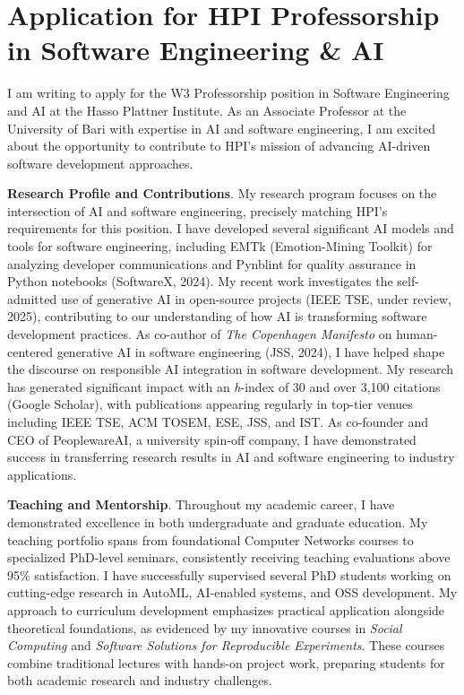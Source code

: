 \section{Application for HPI Professorship in Software Engineering \& AI}

I am writing to apply for the W3 Professorship position in Software Engineering and AI at the Hasso Plattner Institute.
As an Associate Professor at the University of Bari with expertise in AI and software engineering, I am excited about the opportunity to contribute to HPI's mission of advancing AI-driven software development approaches.

\textbf{Research Profile and Contributions}.
My research program focuses on the intersection of AI and software engineering, precisely matching HPI's requirements for this position. 
I have developed several significant AI models and tools for software engineering, including EMTk (Emotion-Mining Toolkit) for analyzing developer communications and Pynblint for quality assurance in Python notebooks (SoftwareX, 2024).
My recent work investigates the self-admitted use of generative AI in open-source projects (IEEE TSE, under review, 2025), contributing to our understanding of how AI is transforming software development practices. 
As co-author of \textit{The Copenhagen Manifesto} on human-centered generative AI in software engineering (JSS, 2024), I have helped shape the discourse on responsible AI integration in software development. 
My research has generated significant impact with an \textit{h}-index of 30 and over 3,100 citations (Google Scholar), with publications appearing regularly in top-tier venues including IEEE TSE, ACM TOSEM, ESE, JSS, and IST.
As co-founder and CEO of PeoplewareAI, a university spin-off company, I have demonstrated success in transferring research results in AI and software engineering to industry applications. 

\textbf{Teaching and Mentorship}.
Throughout my academic career, I have demonstrated excellence in both undergraduate and graduate education. 
My teaching portfolio spans from foundational Computer Networks courses to specialized PhD-level seminars, consistently receiving teaching evaluations above 95\% satisfaction. 
I have successfully supervised several PhD students working on cutting-edge research in AutoML, AI-enabled systems, and OSS development. 
My approach to curriculum development emphasizes practical application alongside theoretical foundations, as evidenced by my innovative courses in \textit{Social Computing} and \textit{Software Solutions for Reproducible Experiments}.
These courses combine traditional lectures with hands-on project work, preparing students for both academic research and industry challenges.

